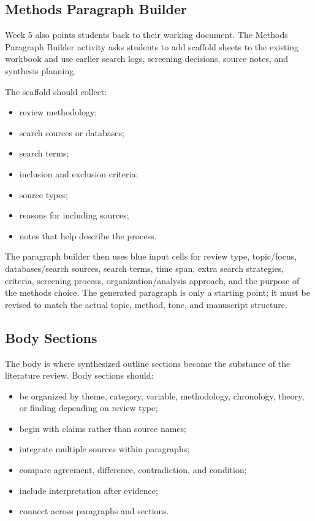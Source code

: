 \documentclass[10pt,letterpaper]{article}
\begin{document}
\subsection{Methods Paragraph Builder}

Week 5 also points students back to their working document. The Methods Paragraph Builder activity asks students to add scaffold sheets to the existing workbook and use earlier search logs, screening decisions, source notes, and synthesis planning.

The scaffold should collect:

\begin{itemize}
\item review methodology;
\item search sources or databases;
\item search terms;
\item inclusion and exclusion criteria;
\item source types;
\item reasons for including sources;
\item notes that help describe the process.
\end{itemize}

The paragraph builder then uses blue input cells for review type, topic/focus, databases/search sources, search terms, time span, extra search strategies, criteria, screening process, organization/analysis approach, and the purpose of the methods choice. The generated paragraph is only a starting point; it must be revised to match the actual topic, method, tone, and manuscript structure.

\subsection{Body Sections}

The body is where synthesized outline sections become the substance of the literature review. Body sections should:

\begin{itemize}
\item be organized by theme, category, variable, methodology, chronology, theory, or finding depending on review type;
\item begin with claims rather than source names;
\item integrate multiple sources within paragraphs;
\item compare agreement, difference, contradiction, and condition;
\item include interpretation after evidence;
\item connect across paragraphs and sections.
\end{itemize}
\end{document}
